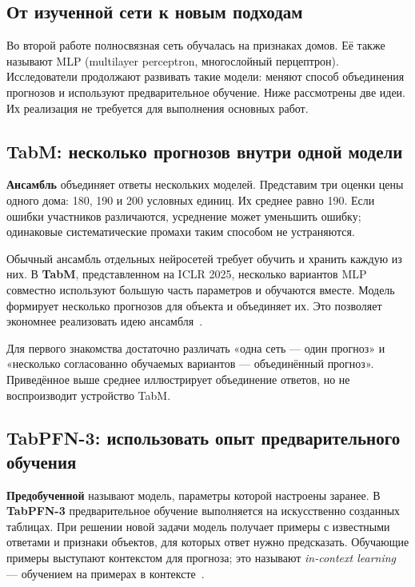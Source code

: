 \label{sec:modern-tabular}
\subsection*{От изученной сети к новым подходам}
Во второй работе полносвязная сеть обучалась на признаках домов. Её также называют MLP (multilayer perceptron, многослойный перцептрон). Исследователи продолжают развивать такие модели: меняют способ объединения прогнозов и используют предварительное обучение. Ниже рассмотрены две идеи. Их реализация не требуется для выполнения основных работ.

\subsection*{TabM: несколько прогнозов внутри одной модели}
\textbf{Ансамбль} объединяет ответы нескольких моделей. Представим три оценки цены одного дома: 180, 190 и 200 условных единиц. Их среднее равно 190. Если ошибки участников различаются, усреднение может уменьшить ошибку; одинаковые систематические промахи таким способом не устраняются.

Обычный ансамбль отдельных нейросетей требует обучить и хранить каждую из них. В \textbf{TabM}, представленном на ICLR 2025, несколько вариантов MLP совместно используют большую часть параметров и обучаются вместе. Модель формирует несколько прогнозов для объекта и объединяет их. Это позволяет экономнее реализовать идею ансамбля~\cite{tabm}.

Для первого знакомства достаточно различать «одна сеть --- один прогноз» и «несколько согласованно обучаемых вариантов --- объединённый прогноз». Приведённое выше среднее иллюстрирует объединение ответов, но не воспроизводит устройство TabM.

\subsection*{TabPFN-3: использовать опыт предварительного обучения}
\textbf{Предобученной} называют модель, параметры которой настроены заранее. В \textbf{TabPFN-3} предварительное обучение выполняется на искусственно созданных таблицах. При решении новой задачи модель получает примеры с известными ответами и признаки объектов, для которых ответ нужно предсказать. Обучающие примеры выступают контекстом для прогноза; это называют \textit{in-context learning} --- обучением на примерах в контексте~\cite{tabpfn3}.


